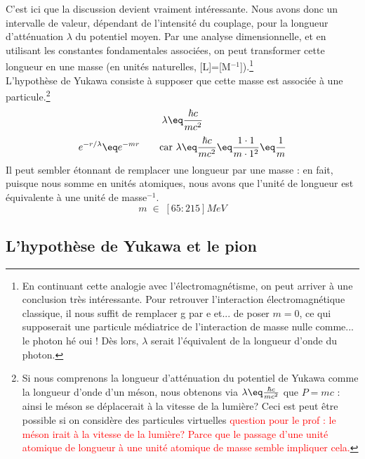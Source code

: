 C'est ici que la discussion devient vraiment intéressante. Nous avons donc un intervalle de valeur, dépendant de l'intensité du couplage, pour la longueur d'atténuation $\lambda$ du potentiel moyen. Par une analyse dimensionnelle, et en utilisant les constantes fondamentales associées, on peut transformer cette longueur en une masse (en unités naturelles, [L]=[M$^{-1}$]).\footnote{En continuant cette analogie avec l'électromagnétisme, on peut arriver à une conclusion très intéressante. Pour retrouver l'interaction électromagnétique classique, il nous suffit de remplacer g par e et... de poser $m = 0$, ce qui supposerait une particule médiatrice de l'interaction de masse nulle comme... le photon hé oui ! Dès lors, $\lambda$ serait l'équivalent de la longueur d'onde du photon.}\\
L'hypothèse de Yukawa consiste à supposer que cette masse est associée à une particule.\footnote{Si nous comprenons la longueur d'atténuation du potentiel de Yukawa comme la longueur d'onde d'un méson, nous obtenons via $\lambda \eq \frac{\hbar c}{mc^2}$ que $P=mc$ : ainsi le méson se déplacerait à la vitesse de la lumière? Ceci est peut être possible si on considère des particules virtuelles \textcolor{red}{question pour le prof : le méson irait à la vitesse de la lumière? Parce que le passage d'une unité atomique de longueur à une unité atomique de masse semble impliquer cela.}}\\
\begin{equation*}
    \lambda \eq \frac{\hbar c}{mc^2}
\end{equation*}
\begin{equation*}
    e^{-r/\lambda} \eq e^{-mr} \qquad \text{car } \lambda \eq \frac{\hbar c}{mc^2} \eq \dfrac{1\cdot 1}{m \cdot 1^2} \eq \dfrac{1}{m}
\end{equation*}
Il peut sembler étonnant de remplacer une longueur par une masse : en fait, puisque nous somme en unités atomiques, nous avons que l'unité de longueur est équivalente à une unité de masse$^{-1}$.
\begin{equation*}
    m\;\in\; [65:215]MeV
\end{equation*}


\subsection{L'hypothèse de Yukawa et le pion}



